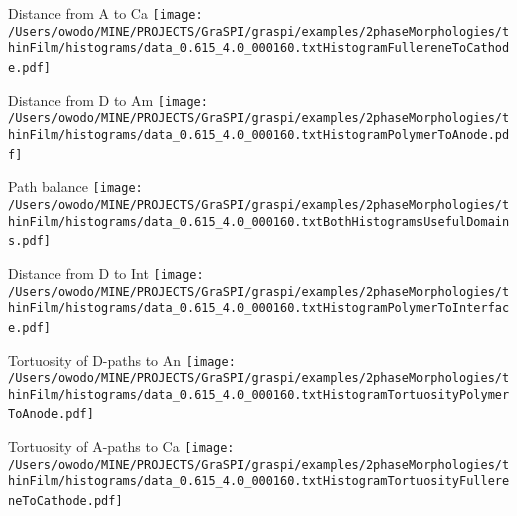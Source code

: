 \documentclass{article}
\begin{document}
\parbox{0.60\textwidth}{
\parbox{0.3\textwidth}{\centering Distance from A to Ca \newline
\texttt{[image: /Users/owodo/MINE/PROJECTS/GraSPI/graspi/examples/2phaseMorphologies/thinFilm/histograms/data\_0.615\_4.0\_000160.txtHistogramFullereneToCathode.pdf]} \ ~ \ } 
\parbox{0.3\textwidth}{\centering Distance from D to Am \newline
\texttt{[image: /Users/owodo/MINE/PROJECTS/GraSPI/graspi/examples/2phaseMorphologies/thinFilm/histograms/data\_0.615\_4.0\_000160.txtHistogramPolymerToAnode.pdf]} \ ~ \ }
\parbox{0.3\textwidth}{\centering Path balance \newline 
\texttt{[image: /Users/owodo/MINE/PROJECTS/GraSPI/graspi/examples/2phaseMorphologies/thinFilm/histograms/data\_0.615\_4.0\_000160.txtBothHistogramsUsefulDomains.pdf]} \ ~ \ }
\parbox{0.3\textwidth}{\centering Distance from D to Int \newline 
\texttt{[image: /Users/owodo/MINE/PROJECTS/GraSPI/graspi/examples/2phaseMorphologies/thinFilm/histograms/data\_0.615\_4.0\_000160.txtHistogramPolymerToInterface.pdf]} \ ~ \ }
\parbox{0.3\textwidth}{\centering Tortuosity of D-paths to An  \newline
\texttt{[image: /Users/owodo/MINE/PROJECTS/GraSPI/graspi/examples/2phaseMorphologies/thinFilm/histograms/data\_0.615\_4.0\_000160.txtHistogramTortuosityPolymerToAnode.pdf]} \ ~ \ }
\parbox{0.3\textwidth}{\centering Tortuosity of A-paths to Ca \newline
\texttt{[image: /Users/owodo/MINE/PROJECTS/GraSPI/graspi/examples/2phaseMorphologies/thinFilm/histograms/data\_0.615\_4.0\_000160.txtHistogramTortuosityFullereneToCathode.pdf]} \ ~ \ }
}
\newpage
\end{document}

